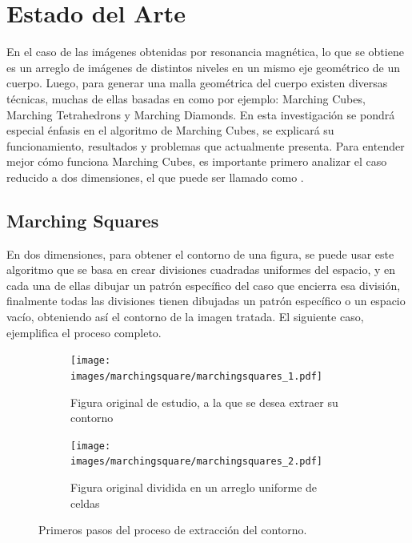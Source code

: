 \chapter{Estado del Arte}
\label{ch:estadoDelArte}

En el caso de las imágenes obtenidas por resonancia magnética, lo que se obtiene es un
arreglo de imágenes de distintos niveles en un mismo eje geométrico de un cuerpo. Luego, para
generar una malla geométrica del cuerpo existen diversas técnicas, muchas de ellas basadas en
 como por ejemplo: Marching Cubes\cite{Lorensen87marchingcubes}, Marching Tetrahedrons\cite{Shirley90apolygonal} y Marching Diamonds.
En esta investigación se pondrá especial énfasis en el algoritmo de Marching Cubes, se
explicará su funcionamiento, resultados y problemas que actualmente presenta.
Para entender mejor cómo funciona Marching Cubes, es importante primero analizar el caso
reducido a dos dimensiones, el que puede ser llamado como .

\section{Marching Squares}
\label{sec:marchingSquares}

En dos dimensiones, para obtener el contorno de una figura, se puede usar este algoritmo
que se basa en crear divisiones cuadradas uniformes del espacio, y en cada una de ellas dibujar un
patrón específico del caso que encierra esa división, finalmente todas las divisiones tienen
dibujadas un patrón específico o un espacio vacío, obteniendo así el contorno de la imagen
tratada. El siguiente caso, ejemplifica el proceso completo.

\newpage
\begin{figure}[h]

	\begin{subfigure}[h]{0.46\textwidth}
		\centering
			\texttt{[image: images/marchingsquare/marchingsquares\_1.pdf]}
		\caption{Figura original de estudio, a la que se desea extraer su contorno}
		\label{f:estadoDelArte:original}
	\end{subfigure}
	\quad
	\begin{subfigure}[h]{0.46\textwidth}
		\centering
			\texttt{[image: images/marchingsquare/marchingsquares\_2.pdf]}
		\caption{Figura original dividida en un arreglo uniforme de celdas}
		\label{f:estadoDelArte:division}
	\end{subfigure}

	\caption{Primeros pasos del proceso de extracción del contorno.}

\end{figure}

